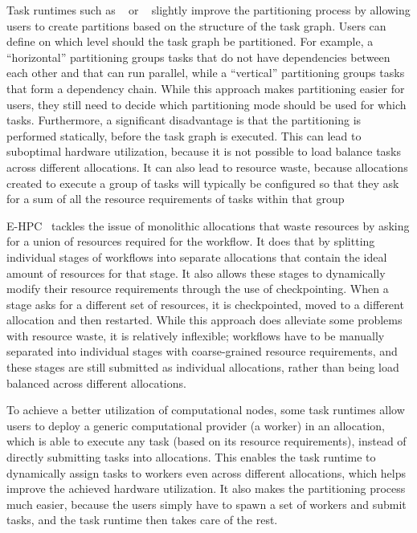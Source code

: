 Task runtimes such as \pegasus{}~\cite{pegasus} or
\autosubmit~\cite{autosubmit} slightly improve the partitioning process by allowing users to
create partitions based on the structure of the task graph. Users can define on which level should
the task graph be partitioned. For example, a ``horizontal'' partitioning groups tasks that do not
have dependencies between each other and that can run parallel, while a ``vertical'' partitioning
groups tasks that form a dependency chain. While this approach makes partitioning easier for users,
they still need to decide which partitioning mode should be used for which tasks. Furthermore, a
significant disadvantage is that the partitioning is performed statically, before the task graph is
executed. This can lead to suboptimal hardware utilization, because it is not possible to load
balance tasks across different allocations. It can also lead to resource waste, because allocations
created to execute a group of tasks will typically be configured so that they ask for a sum of all
the resource requirements of tasks within that group

\textsc{E-HPC}~\cite{ehpc} tackles the issue of monolithic allocations that
waste resources by asking for a union of resources required for the workflow. It does that by
splitting individual stages of workflows into separate allocations that contain the ideal amount of
resources for that stage. It also allows these stages to dynamically modify their resource
requirements through the use of checkpointing. When a stage asks for a different set of resources,
it is checkpointed, moved to a different allocation and then restarted. While this approach does
alleviate some problems with resource waste, it is relatively inflexible; workflows have to be
manually separated into individual stages with coarse-grained resource requirements, and these
stages are still submitted as individual allocations, rather than being load balanced across
different allocations.

To achieve a better utilization of computational nodes, some task runtimes allow users to deploy a
generic computational provider (a worker) in an allocation, which is able to execute any task
(based on its resource requirements), instead of directly submitting tasks into allocations. This
enables the task runtime to dynamically assign tasks to workers even across different allocations,
which helps improve the achieved hardware utilization. It also makes the partitioning process much
easier, because the users simply have to spawn a set of workers and submit tasks, and the task
runtime then takes care of the rest.

